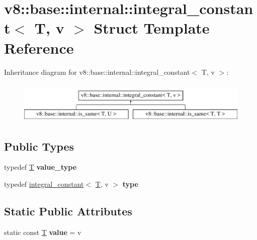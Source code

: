 \hypertarget{structv8_1_1base_1_1internal_1_1integral__constant}{}\section{v8\+:\+:base\+:\+:internal\+:\+:integral\+\_\+constant$<$ T, v $>$ Struct Template Reference}
\label{structv8_1_1base_1_1internal_1_1integral__constant}
Inheritance diagram for v8\+:\+:base\+:\+:internal\+:\+:integral\+\_\+constant$<$ T, v $>$\+:\begin{figure}[H]
\begin{center}
\leavevmode
\includegraphics[height=2.000000cm]{structv8_1_1base_1_1internal_1_1integral__constant}
\end{center}
\end{figure}
\subsection*{Public Types}
\begin{DoxyCompactItemize}
\item 
\mbox{\label{structv8_1_1base_1_1internal_1_1integral__constant_adc3e083f08bc1035153fe02ab192c418}} 
typedef \mbox{\hyperlink{classv8_1_1internal_1_1torque_1_1T}{T}} {\bfseries value\+\_\+type}
\item 
\mbox{\label{structv8_1_1base_1_1internal_1_1integral__constant_a8af419695b338aa7172016087b2064c2}} 
typedef \mbox{\hyperlink{structv8_1_1base_1_1internal_1_1integral__constant}{integral\+\_\+constant}}$<$ \mbox{\hyperlink{classv8_1_1internal_1_1torque_1_1T}{T}}, v $>$ {\bfseries type}
\end{DoxyCompactItemize}
\subsection*{Static Public Attributes}
\begin{DoxyCompactItemize}
\item 
\mbox{\label{structv8_1_1base_1_1internal_1_1integral__constant_a27a0cb6f9f5b1f7c39f22d705a8e320a}} 
static const \mbox{\hyperlink{classv8_1_1internal_1_1torque_1_1T}{T}} {\bfseries value} = v
\end{DoxyCompactItemize}


